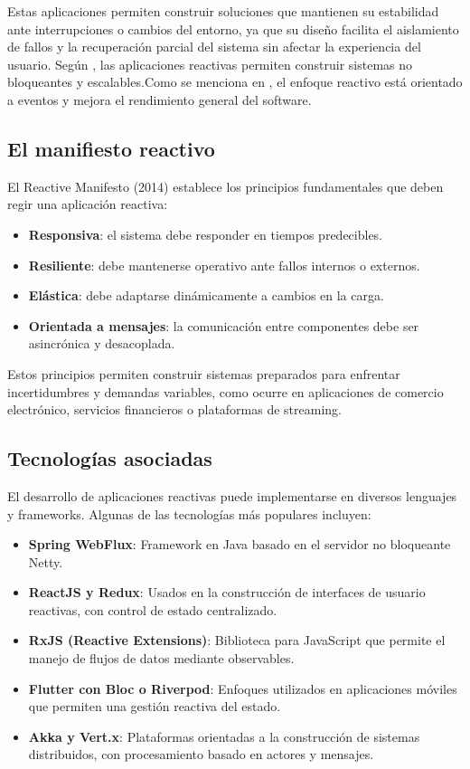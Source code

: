 \documentclass{article}
\begin{document}
Estas aplicaciones permiten construir soluciones que mantienen su estabilidad ante interrupciones o cambios del entorno, ya que su diseño facilita el aislamiento de fallos y la recuperación parcial del sistema sin afectar la experiencia del usuario. Según \textcite{toro2021}, las aplicaciones reactivas permiten construir sistemas no bloqueantes y escalables.Como se menciona en \parencite{villanueva2020}, el enfoque reactivo está orientado a eventos y mejora el rendimiento general del software.

\subsection{El manifiesto reactivo}

El Reactive Manifesto (2014) establece los principios fundamentales que deben regir una aplicación reactiva:

\begin{itemize}
    \item \textbf{Responsiva}: el sistema debe responder en tiempos predecibles.
    \item \textbf{Resiliente}: debe mantenerse operativo ante fallos internos o externos.
    \item \textbf{Elástica}: debe adaptarse dinámicamente a cambios en la carga.
    \item \textbf{Orientada a mensajes}: la comunicación entre componentes debe ser asincrónica y desacoplada.
\end{itemize}

Estos principios permiten construir sistemas preparados para enfrentar incertidumbres y demandas variables, como ocurre en aplicaciones de comercio electrónico, servicios financieros o plataformas de streaming.

\subsection{Tecnologías asociadas}

El desarrollo de aplicaciones reactivas puede implementarse en diversos lenguajes y frameworks. Algunas de las tecnologías más populares incluyen:

\begin{itemize}
    \item \textbf{Spring WebFlux}: Framework en Java basado en el servidor no bloqueante Netty.
    \item \textbf{ReactJS y Redux}: Usados en la construcción de interfaces de usuario reactivas, con control de estado centralizado.
    \item \textbf{RxJS (Reactive Extensions)}: Biblioteca para JavaScript que permite el manejo de flujos de datos mediante observables.
    \item \textbf{Flutter con Bloc o Riverpod}: Enfoques utilizados en aplicaciones móviles que permiten una gestión reactiva del estado.
    \item \textbf{Akka y Vert.x}: Plataformas orientadas a la construcción de sistemas distribuidos, con procesamiento basado en actores y mensajes.
\end{itemize}
\end{document}
